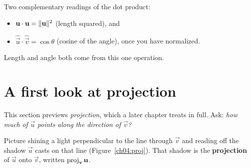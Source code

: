 \begin{focusbox}
Two complementary readings of the dot product:
\begin{itemize}
  \item $\mathbf{u}\cdot\mathbf{u} = \lVert\mathbf{u}\rVert^2$ (length squared), and
  \item $\hat{\vec u}\cdot\hat{\vec v} = \cos\theta$ (cosine of the angle), once you
        have normalized.
\end{itemize}
Length and angle both come from this one operation.
\end{focusbox}

\section{A first look at projection}

This section previews \emph{projection}, which a later chapter treats in full. Ask:
\emph{how much of $\vec u$ points along the direction of $\vec v$?}

Picture shining a light perpendicular to the line through $\vec v$ and reading off
the shadow $\vec u$ casts on that line (Figure~\ref{ch04:proj}). That shadow is the
\textbf{projection} of $\vec u$ onto $\vec v$, written $\operatorname{proj}_{\mathbf{v}}\mathbf{u}$.

